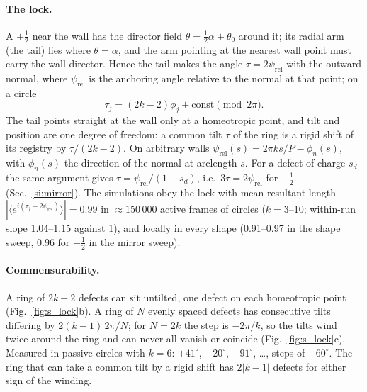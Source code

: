 \documentclass[aps,prl,onecolumn,superscriptaddress,amsmath,amssymb,nofootinbib]{revtex4-2}
\newcommand{\half}{\tfrac12}
\begin{document}
\paragraph{The lock.} A $+\half$ near the wall has the director field $\theta=\half\alpha+\theta_0$ around it; its radial arm (the tail) lies where $\theta=\alpha$,
and the arm pointing at the nearest wall point must carry the wall director. Hence the tail makes the angle $\tau=2\psi_\mathrm{rel}$ with the outward normal, where
$\psi_\mathrm{rel}$ is the anchoring angle relative to the normal at that point; on a circle
\begin{equation}
\tau_j=(2k-2)\phi_j+\mathrm{const}\pmod{2\pi}.
\end{equation}
The tail points straight at the wall only at a homeotropic point, and tilt and position are one degree of freedom: a common tilt $\tau$ of the ring is a rigid shift of its
registry by $\tau/(2k-2)$. On arbitrary walls $\psi_\mathrm{rel}(s)=2\pi ks/P-\phi_n(s)$, with $\phi_n(s)$ the direction of the normal at arclength $s$. For a defect of
charge $s_d$ the same argument gives $\tau=\psi_\mathrm{rel}/(1-s_d)$, i.e.\ $3\tau=2\psi_\mathrm{rel}$ for $-\half$ (Sec.~\ref{si:mirror}). The simulations obey the lock with
mean resultant length $|\langle e^{i(\tau_j-2\psi_\mathrm{rel})}\rangle|=0.99$ in $\approx150\,000$ active frames of circles ($k=3$--10; within-run slope 1.04--1.15 against 1),
and locally in every shape (0.91--0.97 in the shape sweep, 0.96 for $-\half$ in the mirror sweep).

\paragraph{Commensurability.} A ring of $2k-2$ defects can sit untilted, one defect on each homeotropic point (Fig.~\ref{fig:s_lock}b). A ring of $N$ evenly spaced defects
has consecutive tilts differing by $2(k-1)\,2\pi/N$; for $N=2k$ the step is $-2\pi/k$, so the tilts wind twice around the ring and can never all vanish or coincide
(Fig.~\ref{fig:s_lock}c). Measured in passive circles with $k=6$: $+41^\circ$, $-20^\circ$, $-91^\circ$, \dots, steps of $-60^\circ$. The ring that can take a common tilt
by a rigid shift has $2|k-1|$ defects for either sign of the winding.
\end{document}
